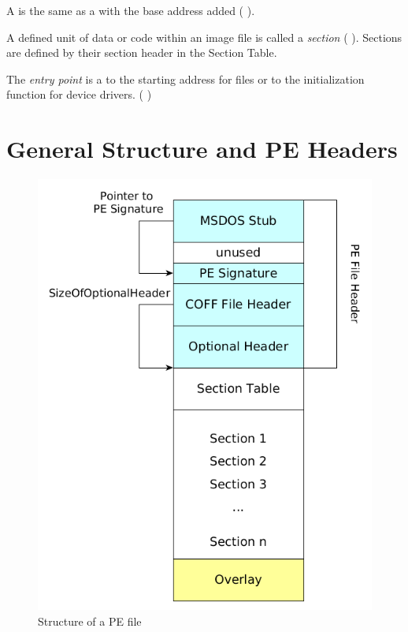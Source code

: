 \begin{definition}[VA]
A \emph{\VA{}} is the same as a \RVA{} with the base address added (\cf{} \cite[]{pespec}).
\end{definition} 

\begin{definition}[section]
A defined unit of data or code within an image file is called a \emph{section} (\cf{} \cite[]{pespec}). Sections are defined by their section header in the Section Table.
\end{definition} 

\begin{definition}
The \emph{entry point} is a \RVA{} to the starting address for \EXE{} files or to the initialization function for device drivers. (\cf{} \cite[]{pespec})
\end{definition} 

\section{General Structure and PE Headers} \label{sec:pestructure}

\begin{figure}
\includegraphics[width=.98\textwidth, height=.60\textheight,keepaspectratio]{graphics/peformat}
\caption{Structure of a PE file}
\label{fig:peformat} 
\end{figure}

